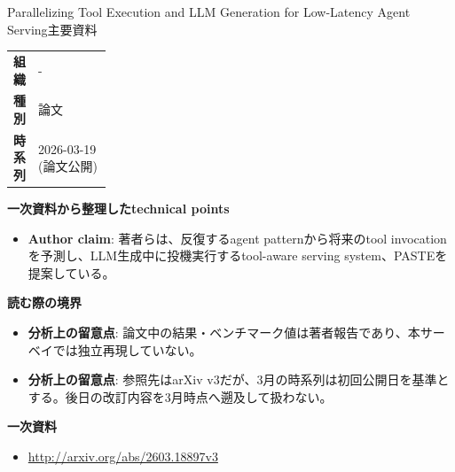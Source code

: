 \begin{technicalnote}{Parallelizing Tool Execution and LLM Generation for Low-Latency Agent Serving}{主要資料}
\begingroup
\begin{tabularx}{\linewidth}{@{}>{\bfseries}p{0.22\linewidth}X@{}}
組織 & - \\
種別 & 論文 \\
時系列 & 2026-03-19 (論文公開) \\
\end{tabularx}
\smallskip
{\bfseries 一次資料から整理したtechnical points}
\begin{itemize}[leftmargin=1.5em,itemsep=0.35em]
\item \textbf{Author claim}: 著者らは、反復するagent patternから将来のtool invocationを予測し、LLM生成中に投機実行するtool-aware serving system、PASTEを提案している。
\end{itemize}
\begin{minipage}{\linewidth}
{\bfseries 読む際の境界}
\begin{itemize}[leftmargin=1.5em,itemsep=0.35em]
\item \textbf{分析上の留意点}: 論文中の結果・ベンチマーク値は著者報告であり、本サーベイでは独立再現していない。
\item \textbf{分析上の留意点}: 参照先はarXiv v3だが、3月の時系列は初回公開日を基準とする。後日の改訂内容を3月時点へ遡及して扱わない。
\end{itemize}
\begin{samepage}
{\bfseries 一次資料}
\begingroup\sloppy
\begin{itemize}[leftmargin=1.5em,itemsep=0.25em]
\item {\scriptsize\url{http://arxiv.org/abs/2603.18897v3}}
\end{itemize}
\endgroup
\end{samepage}
\end{minipage}
\endgroup
\end{technicalnote}
\medskip

